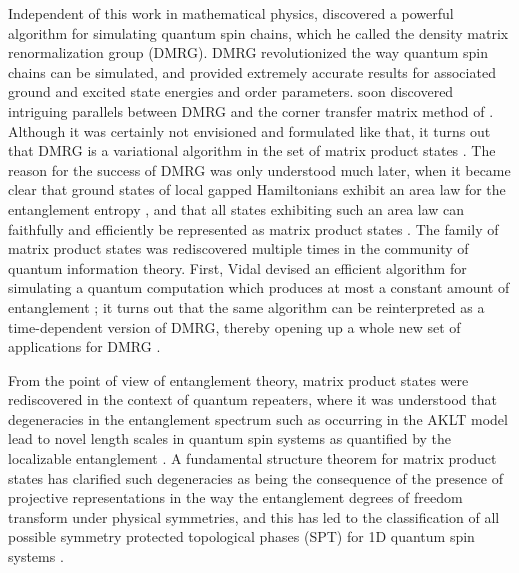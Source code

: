 \documentclass[rmp,aps,reprint,superscriptaddress,nobalancelastpage]{revtex4-1}
\begin{document}
Independent of this work in mathematical physics, \citet{white:DMRG,white1993density} discovered a powerful algorithm for simulating quantum spin chains, which he called the density matrix renormalization group (DMRG). DMRG revolutionized the way quantum spin chains can be simulated, and provided extremely accurate results for associated ground and excited state energies and order parameters. \citet{nishino1996corner}  soon discovered intriguing parallels between DMRG and the corner transfer matrix method of \citet{baxter1981corner}. Although it was certainly not envisioned and formulated like that, it turns out that DMRG is a variational algorithm in the set of matrix product states \cite{ostlund-rommer,dukelsky1998equivalence,verstraete:dmrg-mps}. The reason for the success of DMRG was  only understood much later, when it became clear that ground states of local gapped Hamiltonians exhibit an area law for the entanglement entropy \cite{hastings:arealaw}, and that all states exhibiting such an area law can faithfully and efficiently be represented as matrix product states \cite{verstraete:faithfully}.  The family of matrix product states was rediscovered multiple times in the community of quantum information theory. First, Vidal devised an efficient algorithm for simulating a quantum computation which produces at most a constant amount of entanglement \cite{vidal:simulation-of-comput}; it turns out that the same algorithm can be reinterpreted as a time-dependent version of DMRG, thereby opening up a whole new set of applications for DMRG \cite{vidal:iTEBD,daley2004time,white2004real,verstraete:finite-t-mps}.

From the point of view of entanglement theory, matrix product states were rediscovered in the context of quantum repeaters, where it was understood that degeneracies in the entanglement spectrum such as occurring in the AKLT model lead to novel length scales in quantum spin systems as quantified by the localizable entanglement \cite{verstraete2004entanglement,verstraete:div-ent-length}. A fundamental structure theorem for matrix product states \cite{perez-garcia:stringorder-1d,cirac:mpdo-rgfp,molnar:normal-peps-fundamentalthm} has clarified such degeneracies as being the consequence of the presence of projective representations in the way the entanglement degrees of freedom transform under physical symmetries, and this has led to the classification of all possible symmetry protected topological phases (SPT) for 1D quantum spin systems \cite{pollmann:symprot-1d,chen:1d-phases-rg,schuch:mps-phases}.
\end{document}
